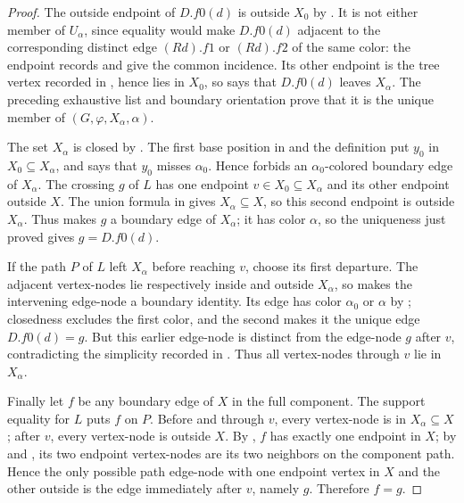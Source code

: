 \begin{proof}
The outside endpoint of $D.f0(d)$ is outside $X_0$ by
.  It is not either member of
$U_\alpha$, since equality would make $D.f0(d)$ adjacent to the
corresponding distinct edge $(R d).f1$ or $(R d).f2$ of the same color:
the endpoint records and  give the common incidence.
Its other endpoint is the tree vertex recorded in
, hence lies in $X_0$, so
 says that $D.f0(d)$ leaves $X_\alpha$.  The
preceding exhaustive list and boundary orientation prove that it is the
unique member of
$(G,\varphi,X_\alpha,\alpha)$.

The set $X_\alpha$ is closed by
.  The first base position in
 and the definition
 put $y_0$ in $X_0\subseteq X_\alpha$, and
 says that $y_0$ misses $\alpha_0$.  Hence
 forbids an
$\alpha_0$-colored boundary edge of $X_\alpha$.  The crossing $g$ of
$L$ has one endpoint $v\in X_0\subseteq X_\alpha$ and its other endpoint
outside $X$.  The union formula in
 gives $X_\alpha\subseteq X$, so this
second endpoint is outside $X_\alpha$.  Thus
 makes $g$ a boundary edge of $X_\alpha$; it has
color $\alpha$, so the uniqueness just proved gives $g=D.f0(d)$.

If the path $P$ of $L$ left $X_\alpha$ before reaching $v$, choose its
first departure.  The adjacent vertex-nodes lie respectively inside and
outside $X_\alpha$, so  makes the intervening
edge-node a boundary identity.  Its edge has color $\alpha_0$ or $\alpha$
by ; closedness excludes the first color,
and the second makes it the unique edge $D.f0(d)=g$.  But this earlier
edge-node is distinct from the edge-node $g$ after $v$, contradicting the
simplicity recorded in .  Thus all
vertex-nodes through $v$ lie in $X_\alpha$.

Finally let $f$ be any boundary edge of $X$ in the full component.  The
support equality for $L$ puts $f$ on $P$.  Before and through $v$, every
vertex-node is in $X_\alpha\subseteq X$; after $v$, every vertex-node is
outside $X$.  By , $f$ has exactly one endpoint in
$X$; by  and , its two
endpoint vertex-nodes are its two neighbors on the component path.  Hence
the only possible path edge-node with one endpoint vertex in $X$ and the
other outside is the edge immediately after $v$, namely $g$.  Therefore
$f=g$.
\end{proof}
